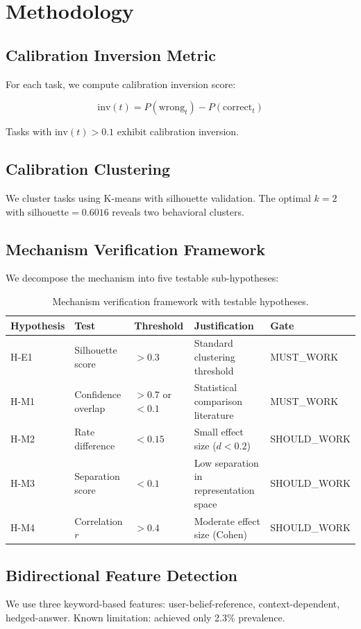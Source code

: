 \section{Methodology}

\subsection{Calibration Inversion Metric}

For each task, we compute calibration inversion score:

\begin{equation}
\text{inv}(t) = P(\text{wrong}_t) - P(\text{correct}_t)
\end{equation}

Tasks with $\text{inv}(t) > 0.1$ exhibit calibration inversion.

\subsection{Calibration Clustering}

We cluster tasks using K-means with silhouette validation. The optimal $k=2$ with silhouette$=0.6016$ reveals two behavioral clusters.

\subsection{Mechanism Verification Framework}

We decompose the mechanism into five testable sub-hypotheses:

\begin{table}[h]
\centering
\begin{tabular}{@{}lllll@{}}
\toprule
Hypothesis & Test & Threshold & Justification & Gate \\
\midrule
H-E1 & Silhouette score & $> 0.3$ & Standard clustering threshold \citep{rousseeuw1987silhouettes} & MUST\_WORK \\
H-M1 & Confidence overlap & $> 0.7$ or $< 0.1$ & Statistical comparison literature & MUST\_WORK \\
H-M2 & Rate difference & $< 0.15$ & Small effect size ($d < 0.2$) & SHOULD\_WORK \\
H-M3 & Separation score & $< 0.1$ & Low separation in representation space & SHOULD\_WORK \\
H-M4 & Correlation $r$ & $> 0.4$ & Moderate effect size (Cohen) & SHOULD\_WORK \\
\bottomrule
\end{tabular}
\caption{Mechanism verification framework with testable hypotheses.}
\label{tab:hypotheses}
\end{table}

\subsection{Bidirectional Feature Detection}

We use three keyword-based features: user-belief-reference, context-dependent, hedged-answer. Known limitation: achieved only 2.3\% prevalence.
